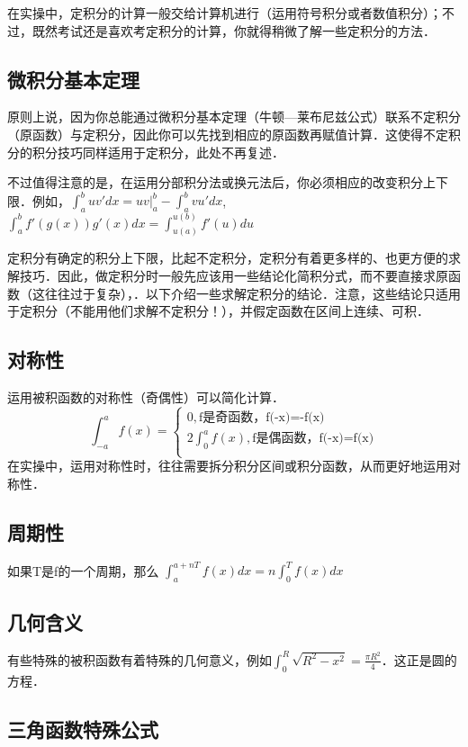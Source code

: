 
在实操中，定积分的计算一般交给计算机进行（运用符号积分或者数值积分）；不过，既然考试还是喜欢考定积分的计算，你就得稍微了解一些定积分的方法．

\subsection{微积分基本定理}
原则上说，因为你总能通过微积分基本定理（牛顿—莱布尼兹公式）联系不定积分（原函数）与定积分，因此你可以先找到相应的原函数再赋值计算．这使得不定积分的积分技巧同样适用于定积分，此处不再复述．

不过值得注意的是，在运用分部积分法或换元法后，你必须相应的改变积分上下限．例如，$\int^b_a uv'dx = uv|^b_a-\int^b_a vu'dx$, $\int^b_a f'(g(x))g'(x)dx = \int ^{u(b)}_{u(a)} f'(u)du$

定积分有确定的积分上下限，比起不定积分，定积分有着更多样的、也更方便的求解技巧．因此，做定积分时一般先应该用一些结论化简积分式，而不要直接求原函数（这往往过于复杂），．以下介绍一些求解定积分的结论．注意，这些结论只适用于定积分（不能用他们求解不定积分！），并假定函数在区间上连续、可积．

\subsection{对称性}
运用被积函数的对称性（奇偶性）可以简化计算．
$$
\int ^a_{-a} f(x) = 
\left \{
\begin{aligned}
0,\text{f是奇函数，f(-x)=-f(x)}\\
2\int ^a_0 f(x),\text{f是偶函数，f(-x)=f(x)}\\
\end{aligned}
\right.
$$
在实操中，运用对称性时，往往需要拆分积分区间或积分函数，从而更好地运用对称性．

\subsection{周期性}
如果T是f的一个周期，那么 $\int ^{a+nT}_{a} f(x)dx= n\int^{T}_0 f(x)dx$

\subsection{几何含义}
有些特殊的被积函数有着特殊的几何意义，例如$\int ^R_0 \sqrt{R^2-x^2}=\frac{\pi R^2}{4}$．这正是圆的方程．

\subsection{三角函数特殊公式}
